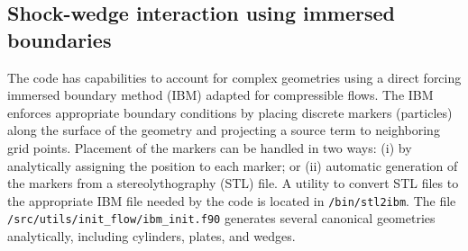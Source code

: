 \documentclass[12pt]{article}
\newcommand{\code}[1]{\texttt{#1}}
\begin{document}
\subsection{Shock-wedge interaction using immersed boundaries}
The code has capabilities to account for complex geometries using a direct forcing immersed boundary method (IBM) adapted for compressible flows. The IBM enforces appropriate boundary conditions by placing discrete markers (particles) along the surface of the geometry and projecting a source term to neighboring grid points. Placement of the markers can be handled in two ways: (i) by analytically assigning the position to each marker; or (ii) automatic generation of the markers from a stereolythography (STL) file. A utility to convert STL files to the appropriate IBM file needed by the code is located in \code{/bin/stl2ibm}. The file \code{/src/utils/init\_flow/ibm\_init.f90} generates several canonical geometries analytically, including cylinders, plates, and wedges.
\end{document}
